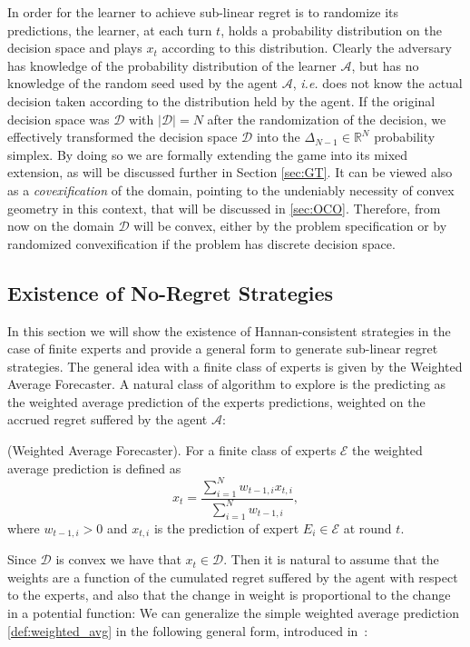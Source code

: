 In order for the learner to achieve sub-linear regret is to randomize its predictions, the learner, at each turn $t$, holds a probability distribution on the decision space and plays $x_t$ according to this distribution. Clearly the adversary has knowledge of the probability distribution of the learner $\mathcal A$, but has no knowledge of the random seed used by the agent $\mathcal A$, \emph{i.e.} does not know the actual decision taken according to the distribution held by the agent. If the original decision space was $\mathcal D$ with $|\mathcal D|=N$ after the randomization of the decision, we effectively transformed the decision space $\mathcal D$ into the $\Delta_{N-1}\in\mathbb R^{N}$ probability simplex. By doing so we are formally extending the game into its mixed extension, as will be discussed further in Section \ref{sec:GT}. It can be viewed also as a \emph{covexification} of the domain, pointing to the undeniably necessity of convex geometry in this context, that will be discussed in \ref{sec:OCO}. Therefore, from now on the domain $\mathcal D$ will be convex, either by the problem specification or by randomized convexification if the problem has discrete decision space.

\subsection{Existence of No-Regret Strategies}
In this section we will show the existence of Hannan-consistent strategies in the case of finite experts and provide a general form to generate sub-linear regret strategies. 
The general idea with a finite class of experts is given by the Weighted Average Forecaster. A natural class of algorithm to explore is the predicting as the weighted average prediction of the experts predictions, weighted on the accrued regret suffered by the agent $\mathcal A$:

\begin{definition}(Weighted Average Forecaster).\label{def:weighted_avg}
For a finite class of experts $\mathcal E$ the weighted average prediction is defined as
\begin{equation}
	x_t = \frac{\sum\limits_{i=1}^{N}w_{t-1,i}x_{t,i}}{\sum\limits_{i=1}^{N}w_{t-1,i}},
\end{equation}
where $w_{t-1,i}>0$ and $x_{t,i}$ is the prediction of expert $E_i\in\mathcal E$ at round $t$. 
\end{definition}

Since $\mathcal D$ is convex we have that $x_t\in\mathcal D$.
Then it is natural to assume that the weights are a function of the cumulated regret suffered by the agent with respect to the experts, and also that the change in weight is proportional to the change in a potential function:
We can generalize the simple weighted average prediction \eqref{def:weighted_avg} in the following general form, introduced in~\cite{cesa2003potential}:

